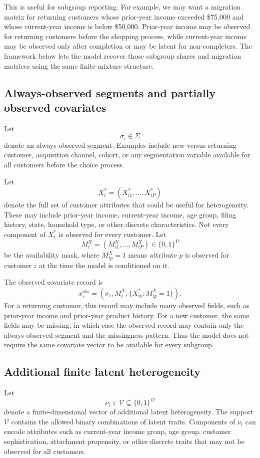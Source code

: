 \documentclass[11pt]{article}
\begin{document}
This is useful for subgroup reporting. For example, we may want a migration matrix for returning customers whose prior-year income exceeded \$75,000 and whose current-year income is below \$50,000. Prior-year income may be observed for returning customers before the shopping process, while current-year income may be observed only after completion or may be latent for non-completers. The framework below lets the model recover those subgroup shares and migration matrices using the same finite-mixture structure.

\subsection{Always-observed segments and partially observed covariates}

Let
\[
\sigma_i\in\Sigma
\]
denote an always-observed segment. Examples include new versus returning customer, acquisition channel, cohort, or any segmentation variable available for all customers before the choice process.

Let
\[
X_i^*=(X_{i1}^*,\ldots,X_{iP}^*)
\]
denote the full set of customer attributes that could be useful for heterogeneity. These may include prior-year income, current-year income, age group, filing history, state, household type, or other discrete characteristics. Not every component of $X_i^*$ is observed for every customer. Let
\[
M_i^X=(M_{i1}^X,\ldots,M_{iP}^X)\in\{0,1\}^P
\]
be the availability mask, where $M_{ip}^X=1$ means attribute $p$ is observed for customer $i$ at the time the model is conditioned on it.

The observed covariate record is
\[
x_i^{obs}=\left(\sigma_i, M_i^X, \{X_{ip}^*:M_{ip}^X=1\}\right).
\]
For a returning customer, this record may include many observed fields, such as prior-year income and prior-year product history. For a new customer, the same fields may be missing, in which case the observed record may contain only the always-observed segment and the missingness pattern. Thus the model does not require the same covariate vector to be available for every subgroup.

\subsection{Additional finite latent heterogeneity}

Let
\[
\nu_i\in\mathcal V\subseteq\{0,1\}^D
\]
denote a finite-dimensional vector of additional latent heterogeneity. The support $\mathcal V$ contains the allowed binary combinations of latent traits. Components of $\nu_i$ can encode attributes such as current-year income group, age group, customer sophistication, attachment propensity, or other discrete traits that may not be observed for all customers.
\end{document}
